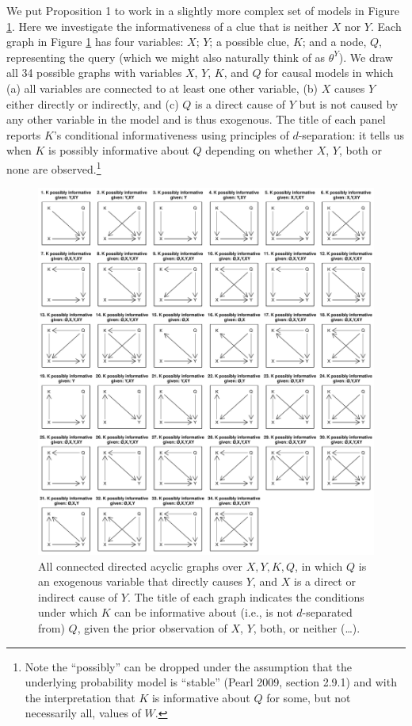\documentclass[
  12pt,
]{book}
\begin{document}
We put Proposition 1 to work in a slightly more complex set of models in Figure \ref{fig:34graphs}. Here we investigate the informativeness of a clue that is neither \(X\) nor \(Y\). Each graph in Figure \ref{fig:34graphs} has four variables: \(X\); \(Y\); a possible clue, \(K\); and a node, \(Q\), representing the query (which we might also naturally think of as \(\theta^Y\)). We draw all 34 possible graphs with variables \(X\), \(Y\), \(K\), and \(Q\) for causal models in which (a) all variables are connected to at least one other variable, (b) \(X\) causes \(Y\) either directly or indirectly, and (c) \(Q\) is a direct cause of \(Y\) but is not caused by any other variable in the model and is thus exogenous. The title of each panel reports \(K\)'s conditional informativeness using principles of \(d\)-separation: it tells us when \(K\) is possibly informative about \(Q\) depending on whether \(X\), \(Y\), both or none are observed.\footnote{Note the ``possibly'' can be dropped under the assumption that the underlying probability model is ``stable'' (Pearl 2009, section 2.9.1) and with the interpretation that \(K\) is informative about \(Q\) for some, but not necessarily all, values of \(W\).}

\begin{figure}
\centering
\includegraphics{ii_files/figure-latex/34graphs-1.pdf}
\caption{\label{fig:34graphs}\label{fig:34graphs} All connected directed acyclic graphs over \(X,Y,K,Q\), in which \(Q\) is an exogenous variable that directly causes \(Y\), and \(X\) is a direct or indirect cause of \(Y\). The title of each graph indicates the conditions under which \(K\) can be informative about (i.e., is not \(d\)-separated from) \(Q\), given the prior observation of \(X\), \(Y\), both, or neither (\ldots).}
\end{figure}
\end{document}
